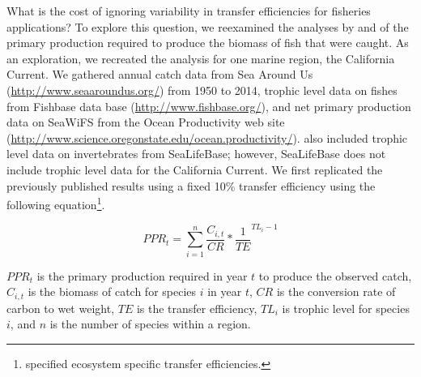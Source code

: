 \documentclass[oneside,12pt,final]{sty/ucthesis-CA2012}
\begin{document}
\begin{mainmatter}
What is the cost of ignoring variability in transfer efficiencies for fisheries applications? To explore this question, we reexamined the analyses by \citet{chassot2010global} and \citet{watson2014primary} of the primary production required to produce the biomass of fish that were caught. As an exploration, we recreated the analysis for one marine region, the California Current. We gathered annual catch data from Sea Around Us (\url{http://www.seaaroundus.org/}) from 1950 to 2014, trophic level data on fishes from Fishbase data base (\url{http://www.fishbase.org/}), and net primary production data on SeaWiFS from the Ocean Productivity web site (\url{http://www.science.oregonstate.edu/ocean.productivity/}). \citet{watson2014primary} also included trophic level data on invertebrates from SeaLifeBase; however, SeaLifeBase does not include trophic level data for the California Current. We first replicated the previously published results using a fixed 10\% transfer efficiency using the following equation\footnote{\citet{chassot2010global} specified ecosystem specific transfer efficiencies.}.

\begin{equation}
PPR_t = \sum_{i=1}^{n}\frac{C_{i,t}}{CR}*\frac{1}{TE}^{TL_i-1}
\end{equation}

$PPR_t$ is the primary production required in year $t$ to produce the observed catch, $C_{i,t}$ is the biomass of catch for species $i$ in year $t$, $CR$ is the conversion rate of carbon to wet weight, $TE$ is the transfer efficiency, $TL_i$ is trophic level for species $i$, and $n$ is the number of species within a region. 

\vspace{5mm}


\end{mainmatter}
\end{document}
